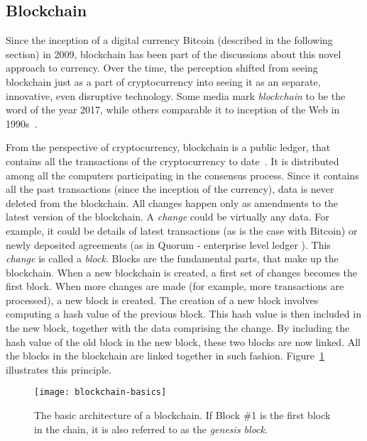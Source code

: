 \subsection{Blockchain}
% 
Since the inception of a digital currency Bitcoin (described in the following section) in 2009, blockchain has been part of the discussions about this novel approach to currency. Over the time, the perception shifted from seeing blockchain just as a part of cryptocurrency into seeing it as an separate, innovative, even disruptive technology. Some media mark \textit{blockchain} to be the word of the year 2017\footnotemark, while others comparable it to inception of the Web in 1990s~\cite[p. 14]{Swan2015BlockchainEconomy}.
% 

From the perspective of cryptocurrency, blockchain is a public ledger, that contains all the transactions of the cryptocurrency to date~\cite{Swan2015BlockchainEconomy}. It is distributed among all the computers participating in the consensus process. Since it contains all the past transactions (since the inception of the currency), data is never deleted from the blockchain. All changes happen only as amendments to the latest version of the blockchain. A \textit{change} could be virtually any data. For example, it could be details of latest transactions (as is the case with Bitcoin) or newly deposited agreements (as in Quorum - enterprise level ledger \footnotemark ). This \textit{change} is called a \textit{block}. Blocks are the fundamental parts, that make up the blockchain. When a new blockchain is created, a first set of changes becomes the first block.
% 
% 
When more changes are made (for example, more transactions are processed), a new block is created. The creation of a new block involves computing a hash value of the previous block. This hash value is then included in the new block, together with the data comprising the change. By including the hash value of the old block in the new block, these two blocks are now linked. All the blocks in the blockchain are linked together in such fashion. Figure~\ref{fig:blockch-basics} illustrates this principle. 
% 
\begin{figure}[ht]
    \centering
    \texttt{[image: blockchain-basics]}
    \caption{The basic architecture of a blockchain. If Block \#1 is the first block in the chain, it is also referred to as the \textit{genesis block}.}
    \label{fig:blockch-basics}
\end{figure}

